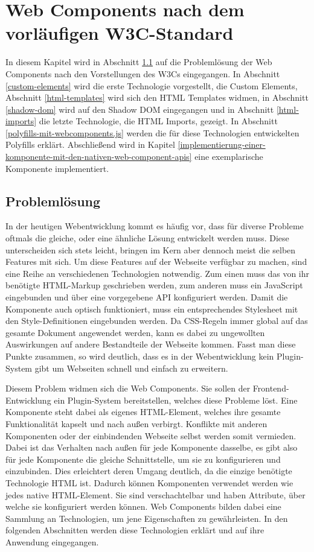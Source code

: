 \chapter{Web Components nach dem vorläufigen W3C-Standard}\label{web-components-nach-w3c}

In diesem Kapitel wird in Abschnitt \ref{problemloesung} auf die Problemlösung der Web Components nach den Vorstellungen des \ac{W3C}s eingegangen. In Abschnitt \ref{custom-elements} wird die erste Technologie vorgestellt, die Custom Elements, Abschnitt \ref{html-templates} wird sich den \ac{HTML} Templates widmen, in Abschnitt \ref{shadow-dom} wird auf den Shadow \ac{DOM} eingegangen und in Abschnitt \ref{html-imports} die letzte Technologie, die \ac{HTML} Imports, gezeigt. In Abschnitt \ref{polyfills-mit-webcomponents.js} werden die für diese Technologien entwickelten Polyfills erklärt. Abschließend wird in Kapitel \ref{implementierung-einer-komponente-mit-den-nativen-web-component-apis} eine exemplarische Komponente implementiert.


\section{Problemlösung}\label{problemloesung}

In der heutigen Webentwicklung kommt es häufig vor, dass für diverse Probleme oftmals die gleiche, oder eine ähnliche Lösung entwickelt werden muss. Diese unterscheiden sich stets leicht, bringen im Kern aber dennoch meist die selben Features mit sich. Um diese Features auf der Webseite verfügbar zu machen, sind eine Reihe an verschiedenen Technologien notwendig. Zum einen muss das von ihr benötigte \ac{HTML}-Markup geschrieben werden, zum anderen muss ein JavaScript eingebunden und über eine vorgegebene \ac{API} konfiguriert werden. Damit die Komponente auch optisch funktioniert, muss ein entsprechendes Style\-sheet mit den Style-Definitionen eingebunden werden. Da \ac{CSS}-Regeln immer global auf das gesamte Dokument angewendet werden, kann es dabei zu ungewollten Auswirkungen auf andere Bestandteile der Webseite kommen. Fasst man diese Punkte zusammen, so wird deutlich, dass es in der Webentwicklung kein Plugin-System gibt um Webseiten schnell und einfach zu erweitern.

Diesem Problem widmen sich die Web Components. Sie sollen der Frontend-Ent\-wick\-lung ein Plugin-System bereitstellen, welches diese Probleme löst. Eine Komponente steht dabei als eigenes \ac{HTML}-Element, welches ihre gesamte Funktionalität kapselt und nach außen verbirgt. Konflikte mit anderen Komponenten oder der einbindenden Webseite selbst werden somit vermieden. Dabei ist das Verhalten nach außen für jede Komponente dasselbe, es gibt also für jede Komponente die gleiche Schnittstelle, um sie zu konfigurieren und einzubinden. Dies erleichtert deren Umgang deutlich, da die einzige benötigte Technologie \ac{HTML} ist. Dadurch können Komponenten verwendet werden wie jedes native \ac{HTML}-Element. Sie sind verschachtelbar und haben Attribute, über welche sie konfiguriert werden können. Web Components bilden dabei eine Sammlung an Technologien, um jene Eigenschaften zu gewährleisten. In den folgenden Abschnitten werden diese Technologien erklärt und auf ihre Anwendung eingegangen.
